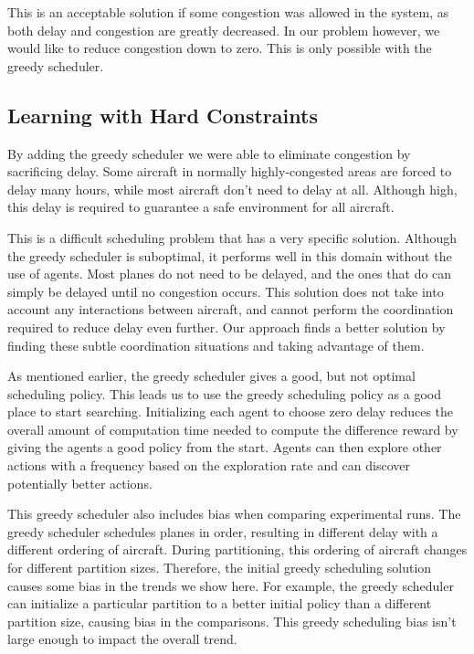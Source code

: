 \documentclass[onehalf,11pt]{beavtex}
\begin{document}
This is an acceptable solution if some congestion was allowed in the system, as both delay and congestion are greatly decreased. In our problem however, we would like to reduce congestion down to zero. This is only possible with the greedy scheduler.

\subsection{Learning with Hard Constraints}
By adding the greedy scheduler we were able to eliminate congestion by sacrificing delay. Some aircraft in normally highly-congested areas are forced to delay many hours, while most aircraft don't need to delay at all. Although high, this delay is required to guarantee a safe environment for all aircraft. 

This is a difficult scheduling problem that has a very specific solution. Although the greedy scheduler is suboptimal, it performs well in this domain without the use of agents. Most planes do not need to be delayed, and the ones that do can simply be delayed until no congestion occurs. This solution does not take into account any interactions between aircraft, and cannot perform the coordination required to reduce delay even further. Our approach finds a better solution by finding these subtle coordination situations and taking advantage of them.  

As mentioned earlier, the greedy scheduler gives a good, but not optimal scheduling policy. This leads us to use the greedy scheduling policy as a good place to start searching. Initializing each agent to choose zero delay reduces the overall amount of computation time needed to compute the difference reward by giving the agents a good policy from the start. Agents can then explore other actions with a frequency based on the exploration rate and can discover potentially better actions.
  
This greedy scheduler also includes bias when comparing experimental runs. The greedy scheduler schedules planes in order, resulting in different delay with a different ordering of aircraft. During partitioning, this ordering of aircraft changes for different partition sizes. Therefore, the initial greedy scheduling solution causes some bias in the trends we show here. For example, the greedy scheduler can initialize a particular partition to a better initial policy than a different partition size, causing bias in the comparisons. This greedy scheduling bias isn't large enough to impact the overall trend.
\end{document}
